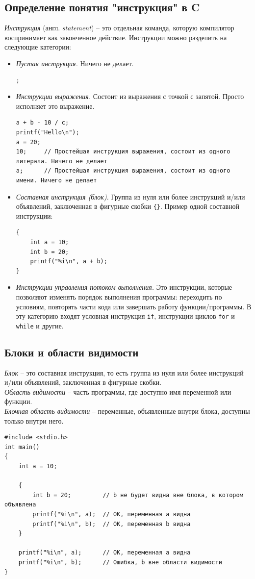 \documentclass{article}
\begin{document}
\subsection*{Определение понятия "инструкция"{} в C}
\textit{Инструкция} (англ. \textit{statement}) -- это отдельная команда, которую компилятор воспринимает как законченное действие. Инструкции можно разделить на следующие категории:
\begin{itemize}
\item \textit{Пустая инструкция.} Ничего не делает.
\begin{lstlisting}
;
\end{lstlisting}

\item \textit{Инструкции выражения.} Состоит из выражения с точкой с запятой. Просто исполняет это выражение.
\begin{lstlisting}
a + b - 10 / c;
printf("Hello\n");
a = 20;
10;		// Простейшая инструкция выражения, состоит из одного литерала. Ничего не делает
a;		// Простейшая инструкция выражения, состоит из одного имени. Ничего не делает
\end{lstlisting}

\item \textit{Составная инструкция (блок).} Группа из нуля или более инструкций и/или объявлений, заключенная в фигурные скобки \texttt{\{\}}.
Пример одной составной инструкции:
\begin{lstlisting}
{
	int a = 10;
	int b = 20;
	printf("%i\n", a + b);
}
\end{lstlisting}

\item \textit{Инструкции управления потоком выполнения.} Это инструкции, которые позволяют изменять порядок выполнения программы: переходить по условиям, повторять части кода или завершать работу функции/программы. В эту категорию входят условная инструкция \texttt{if}, инструкции циклов \texttt{for} и \texttt{while} и другие.
\end{itemize}


\subsection*{Блоки и области видимости}
\textit{Блок} -- это составная инструкция, то есть группа из нуля или более инструкций и/или объявлений, заключенная в фигурные скобки.\\
\textit{Область видимости} -- часть программы, где доступно имя переменной или функции.\\
\textit{Блочная область видимости} -- переменные, объявленные внутри блока, доступны только внутри него.
\begin{lstlisting}
#include <stdio.h>
int main() 
{
    int a = 10;
    
    {
        int b = 20;			// b не будет видна вне блока, в котором объявлена
        printf("%i\n", a);  // ОК, переменная a видна
        printf("%i\n", b);  // ОК, переменная b видна
    }

    printf("%i\n", a);  	// ОК, переменная a видна
    printf("%i\n", b);  	// Ошибка, b вне области видимости
}
\end{lstlisting}
\end{document}
